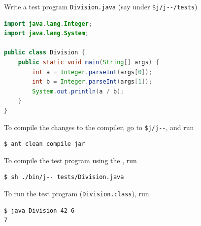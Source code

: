 \documentclass[8pt,a4paper,compress]{beamer}
\begin{document}
\begin{frame}[fragile]
\pause

Write a test \jmm program \lstinline{Division.java} (say under \lstinline{$j/j--/tests})

\begin{tcolorbox}[enhanced,drop shadow southwest,sharp corners,size=fbox,colback=white,fontlower=\small\ttfamily,collower=silver900]

\begin{lstlisting}[language=Java,style=focusin]
import java.lang.Integer;
import java.lang.System;

public class Division {
    public static void main(String[] args) {
        int a = Integer.parseInt(args[0]);
        int b = Integer.parseInt(args[1]);
        System.out.println(a / b);
    }
}
\end{lstlisting}
\end{tcolorbox}

\pause\bigskip

To compile the changes to the \jmm compiler, go to \lstinline{$j/j--}, and run

\begin{tcolorbox}[enhanced,drop shadow southwest,sharp corners,size=fbox,colback=black]
\begin{lstlisting}[style=terminal]
$ ant clean compile jar
\end{lstlisting}
\end{tcolorbox}

\pause\bigskip

To compile the test program using the \jmm, run

\begin{tcolorbox}[enhanced,drop shadow southwest,sharp corners,size=fbox,colback=black]
\begin{lstlisting}[style=terminal]
$ sh ./bin/j-- tests/Division.java
\end{lstlisting}
\end{tcolorbox}

\pause\bigskip

To run the test program (\lstinline{Division.class}), run

\begin{tcolorbox}[enhanced,drop shadow southwest,sharp corners,size=fbox,colback=black]
\begin{lstlisting}[style=terminal]
$ java Division 42 6
7
\end{lstlisting}
\end{tcolorbox}
\end{frame}
\end{document}
